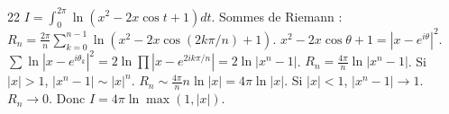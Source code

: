 \begin{correction}{22}
$I = \int_0^{2\pi} \ln(x^2 - 2x \cos t + 1) dt$.
Sommes de Riemann : $R_n = \frac{2\pi}{n} \sum_{k=0}^{n-1} \ln(x^2 - 2x \cos(2k\pi/n) + 1)$.
$x^2 - 2x \cos \theta + 1 = |x - e^{i\theta}|^2$.
$\sum \ln |x-e^{i\theta_k}|^2 = 2 \ln \prod |x-e^{2ik\pi/n}| = 2 \ln |x^n-1|$.
$R_n = \frac{4\pi}{n} \ln |x^n-1|$.
Si $|x| > 1$, $|x^n-1| \sim |x|^n$. $R_n \sim \frac{4\pi}{n} n \ln |x| = 4\pi \ln |x|$.
Si $|x| < 1$, $|x^n-1| \to 1$. $R_n \to 0$.
Donc $I = 4\pi \ln \max(1, |x|)$.
\end{correction}
